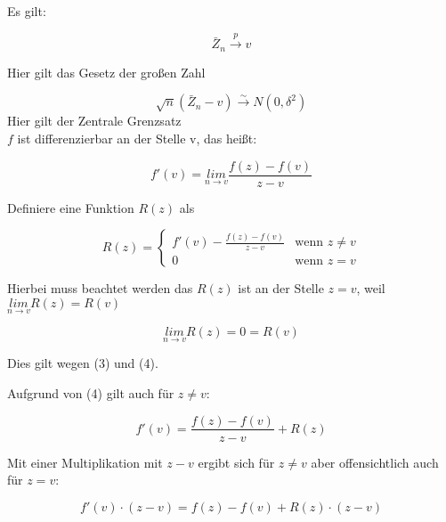 \documentclass[10pt]{article}
\newcommand{\KW}{\overset{p} \longrightarrow} %
\newcommand{\KV}{\overset{\sim} \longrightarrow} %
\newcommand{\eqname}[1]{\tag*{#1}}%
\newenvironment{BWS}[1][]
{\begin{Beweis}[frametitle=#1]}{\end{Beweis}}
\begin{document}
	
	\begin{BWS}[Beweis 1.1 Delta-Methode]
		Es gilt:
		
		
		\begin{equation*}
			\bar{Z}_n \KW v  \eqname{(1)}
		\end{equation*}
		
		Hier gilt das Gesetz der großen Zahl
		
		\begin{equation*}
			\sqrt{n} (\bar{Z}_n - v) \KV N(0,\delta^2) \eqname{(2)}
		\end{equation*}
		Hier gilt der Zentrale Grenzsatz\\
		
		$f$ ist differenzierbar an der Stelle v, das heißt: 
		
		\begin{equation*}
			f'(v) = \underset{n \rightarrow v}{lim} \frac{f(z) - f(v)}{z-v} \eqname{(3)}
		\end{equation*}
		
		Definiere eine Funktion $R(z)$ als
		
		\begin{equation*}
			R(z) = \begin{cases} 
				f'(v) - \frac{f(z)- f(v)}{z-v} &\text{wenn } z \neq v\\
				0 &\text{wenn } z = v
			\end{cases} \eqname{(4)}
		\end{equation*}
		
		Hierbei muss beachtet werden das $R(z)$ ist an der Stelle $z=v$, weil $\underset{n \rightarrow v} {lim} R(z) = R(v)$
		
		\begin{equation*}
			\underset{n \rightarrow v} {lim} R(z) = 0 = R(v)
		\end{equation*}
		
		Dies gilt wegen (3) und (4).
		
		Aufgrund von (4) gilt auch für $z \neq v$:
		
		\begin{equation*}
			f'(v)=\frac{f(z) - f(v)}{z - v} + R(z)
		\end{equation*}
		
		Mit einer Multiplikation mit $z-v$ ergibt sich für $z \neq v$ aber offensichtlich auch für $z = v$:
		
		\begin{equation*}
			f'(v) \cdot (z-v) = f(z) - f(v) + R(z) \cdot (z-v)
		\end{equation*}
		

\end{BWS}
\end{document}
